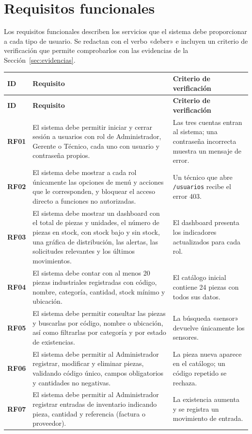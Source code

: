 \documentclass[12pt,letterpaper]{article}
\newcommand{\encabezado}[3]{\rowcolor{azulClaro} \textbf{#1} & \textbf{#2} & \textbf{#3} \\ \hline}
\begin{document}
\section{Requisitos funcionales}

Los requisitos funcionales describen los servicios que el sistema debe proporcionar a cada tipo de usuario. Se redactan con el verbo «deber» e incluyen un criterio de verificación que permite comprobarlos con las evidencias de la Sección~\ref{sec:evidencias}.

\begin{longtable}{|>{\bfseries}p{1.3cm}|p{8.3cm}|p{5.2cm}|}
\hline
\encabezado{ID}{Requisito}{Criterio de verificación}
\endfirsthead
\hline
\encabezado{ID}{Requisito}{Criterio de verificación}
\endhead
RF01 & El sistema debe permitir iniciar y cerrar sesión a usuarios con rol de Administrador, Gerente o Técnico, cada uno con usuario y contraseña propios. & Las tres cuentas entran al sistema; una contraseña incorrecta muestra un mensaje de error. \\ \hline
RF02 & El sistema debe mostrar a cada rol únicamente las opciones de menú y acciones que le corresponden, y bloquear el acceso directo a funciones no autorizadas. & Un técnico que abre \texttt{/usuarios} recibe el error 403. \\ \hline
RF03 & El sistema debe mostrar un dashboard con el total de piezas y unidades, el número de piezas en stock, con stock bajo y sin stock, una gráfica de distribución, las alertas, las solicitudes relevantes y los últimos movimientos. & El dashboard presenta los indicadores actualizados para cada rol. \\ \hline
RF04 & El sistema debe contar con al menos 20 piezas industriales registradas con código, nombre, categoría, cantidad, stock mínimo y ubicación. & El catálogo inicial contiene 24 piezas con todos sus datos. \\ \hline
RF05 & El sistema debe permitir consultar las piezas y buscarlas por código, nombre o ubicación, así como filtrarlas por categoría y por estado de existencias. & La búsqueda «sensor» devuelve únicamente los sensores. \\ \hline
RF06 & El sistema debe permitir al Administrador registrar, modificar y eliminar piezas, validando código único, campos obligatorios y cantidades no negativas. & La pieza nueva aparece en el catálogo; un código repetido se rechaza. \\ \hline
RF07 & El sistema debe permitir al Administrador registrar entradas de inventario indicando pieza, cantidad y referencia (factura o proveedor). & La existencia aumenta y se registra un movimiento de entrada. \\ \hline

\end{longtable}
\end{document}
